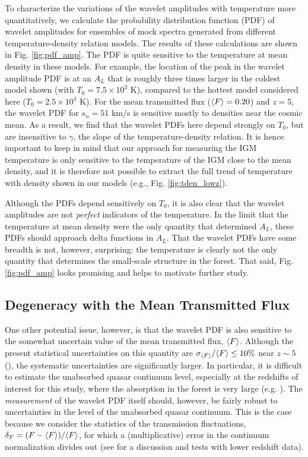 To characterize the variations of the wavelet amplitudes with temperature more quantitatively, we calculate the probability distribution function (PDF) of wavelet amplitudes for ensembles
of mock spectra generated from different temperature-density relation models. The results of these calculations are shown
in Fig. \ref{fig:pdf_amp}.
The PDF is quite sensitive to the temperature
at mean density in these models. For example, the location of the peak in the wavelet amplitude PDF is at an $A_L$ that is roughly
three times larger in the coldest model shown (with $T_0 = 7.5 \times 10^3$ K), compared to the hottest model considered here
($T_0 = 2.5 \times 10^4$ K). 
For the mean transmitted flux ($\langle F \rangle=0.20$) and $z=5$, the wavelet PDF for $s_n=51$ km/s is
sensitive mostly to densities near the cosmic mean. As a result, we find that the wavelet PDFs here depend strongly on
$T_0$, but are insensitive to $\gamma$, the slope of the temperature-density relation. It is hence important to keep in mind that our approach
for measuring the IGM temperature is only sensitive to the temperature of the IGM close to the mean density, and it is therefore not possible
to extract
the full trend of temperature with density shown in our models (e.g., Fig. \ref{fig:tden_lowz}).

Although the PDFs depend sensitively
on $T_0$, it is also clear that the wavelet amplitudes are not {\em perfect} indicators of the temperature. In the limit
that the temperature at mean density were the only quantity that determined $A_L$, these PDFs should approach delta functions
in $A_L$.
That the wavelet PDFs have some breadth is not, however, surprising: the temperature is clearly not the only quantity that
determines the small-scale structure in the forest. That said, Fig. \ref{fig:pdf_amp} looks promising and helps to motivate
further study.


\subsection{Degeneracy with the Mean Transmitted Flux}
\label{sec:IGMTemperaturedegen_amf}

One other potential issue, however, is that the wavelet PDF is also sensitive to the somewhat uncertain value of the mean transmitted 
flux, $\langle F \rangle$. Although the present statistical uncertainties on this quantity are $\sigma_{\langle F \rangle}/\langle F \rangle \leq 10\%$ near $z \sim 5$ (\citealt{Becker:2012aq}), the systematic uncertainties are significantly larger. In particular, it is difficult
to estimate the unabsorbed quasar continuum level, especially at the redshifts of interest for this study, where the
absorption in the forest is very large (e.g. \citealt{2008ApJ...681..831F}). The {\em measurement} of the wavelet PDF itself should, however,
be fairly robust to uncertainties in the level of the unabsorbed quasar continuum. This is the case because we consider the statistics
of the transmission fluctuations, $\delta_F = (F - \langle F \rangle)/\langle F \rangle$, for which a (multiplicative) error in the continuum normalization
divides out (see \citet{Lidz:2009ca} for a discussion and tests with lower redshift data).


